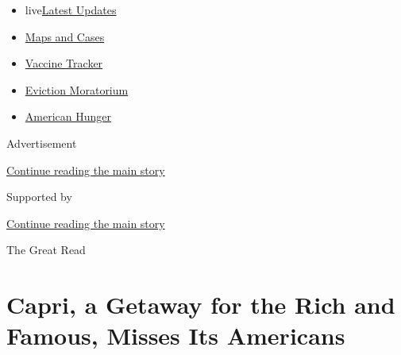 \begin{itemize}
\tightlist
\item
  live\href{https://www.nytimes3xbfgragh.onion/2020/09/08/world/covid-19-coronavirus.html?name=styln-coronavirus-national\&region=TOP_BANNER\&block=storyline_menu_recirc\&action=click\&pgtype=Article\&impression_id=bae65600-f27e-11ea-b230-435ddf4f92b6\&variant=undefined}{Latest
  Updates}
\item
  \href{https://www.nytimes3xbfgragh.onion/interactive/2020/us/coronavirus-us-cases.html?name=styln-coronavirus-national\&region=TOP_BANNER\&block=storyline_menu_recirc\&action=click\&pgtype=Article\&impression_id=bae65601-f27e-11ea-b230-435ddf4f92b6\&variant=undefined}{Maps
  and Cases}
\item
  \href{https://www.nytimes3xbfgragh.onion/interactive/2020/science/coronavirus-vaccine-tracker.html?name=styln-coronavirus-national\&region=TOP_BANNER\&block=storyline_menu_recirc\&action=click\&pgtype=Article\&impression_id=bae67d10-f27e-11ea-b230-435ddf4f92b6\&variant=undefined}{Vaccine
  Tracker}
\item
  \href{https://www.nytimes3xbfgragh.onion/2020/09/02/your-money/eviction-moratorium-covid.html?name=styln-coronavirus-national\&region=TOP_BANNER\&block=storyline_menu_recirc\&action=click\&pgtype=Article\&impression_id=bae67d11-f27e-11ea-b230-435ddf4f92b6\&variant=undefined}{Eviction
  Moratorium}
\item
  \href{https://www.nytimes3xbfgragh.onion/interactive/2020/09/02/magazine/food-insecurity-hunger-us.html?name=styln-coronavirus-national\&region=TOP_BANNER\&block=storyline_menu_recirc\&action=click\&pgtype=Article\&impression_id=bae67d12-f27e-11ea-b230-435ddf4f92b6\&variant=undefined}{American
  Hunger}
\end{itemize}

Advertisement

\protect\hyperlink{after-top}{Continue reading the main story}

Supported by

\protect\hyperlink{after-sponsor}{Continue reading the main story}

The Great Read

\hypertarget{capri-a-getaway-for-the-rich-and-famous-misses-its-americans}{%
\section{Capri, a Getaway for the Rich and Famous, Misses Its
Americans}\label{capri-a-getaway-for-the-rich-and-famous-misses-its-americans}}

